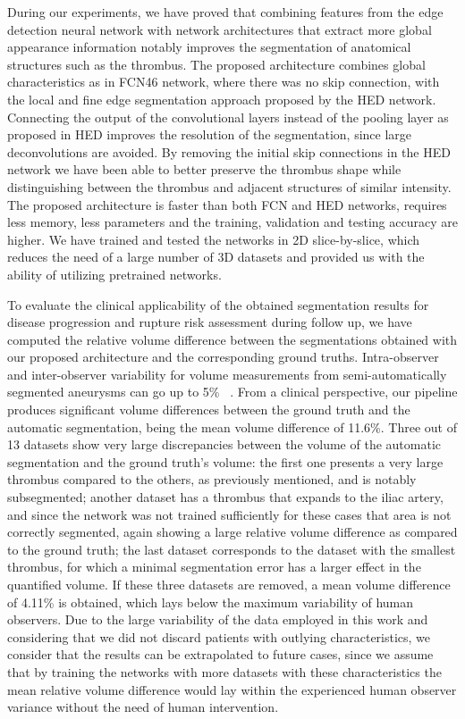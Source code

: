\documentclass[preprint,authoryear,12pt]{elsarticle}
\begin{document}
During our experiments, we have proved that combining features from the edge detection neural network with network architectures that extract more global appearance information notably improves the segmentation of anatomical structures such as the thrombus. The proposed architecture combines global characteristics as in FCN46 network, where there was no skip connection, with the local and fine edge segmentation approach proposed by the HED network. Connecting the output of the convolutional layers instead of the pooling layer as proposed in HED improves the resolution of the segmentation, since large deconvolutions are avoided. By removing the initial skip connections in the HED network we have been able to better preserve the thrombus shape while distinguishing between the thrombus and adjacent structures of similar intensity. The proposed architecture is faster than both FCN and HED networks, requires less memory, less parameters and the training, validation and testing accuracy are higher. We have trained and tested the networks in 2D slice-by-slice, which reduces the need of a large number of 3D datasets and provided us with the ability of utilizing pretrained networks. \par

To evaluate the clinical applicability of the obtained segmentation results for disease progression and rupture risk assessment during follow up, we have computed the relative volume difference between the segmentations obtained with our proposed architecture and the corresponding ground truths. %
Intra-observer and inter-observer variability for volume measurements from semi-automatically segmented aneurysms can go up to 5\% ~\citep{Cha02,parr11,van08}. From a clinical perspective, our pipeline produces significant volume differences between the ground truth and the automatic segmentation, being the mean volume difference of 11.6\%. Three out of 13 datasets show very large discrepancies between the volume of the automatic segmentation and the ground truth's volume: the first one presents a very large thrombus compared to the others, as previously mentioned, and is notably subsegmented; another dataset has a thrombus that expands to the iliac artery, and since the network was not trained sufficiently for these cases that area is not correctly segmented, again showing a large relative volume difference as compared to the ground truth; the last dataset corresponds to the dataset with the smallest thrombus, for which a minimal segmentation error has a larger effect in the quantified volume. If these three datasets are removed, a mean volume difference of 4.11\% is obtained, which lays below the maximum variability of human observers. Due to the large variability of the data employed in this work and considering that we did not discard patients with outlying characteristics, we consider that the results can be extrapolated to future cases, since we assume that by training the networks with more datasets with these characteristics the mean relative volume difference would lay within the experienced human observer variance without the need of human intervention. 
\end{document}
